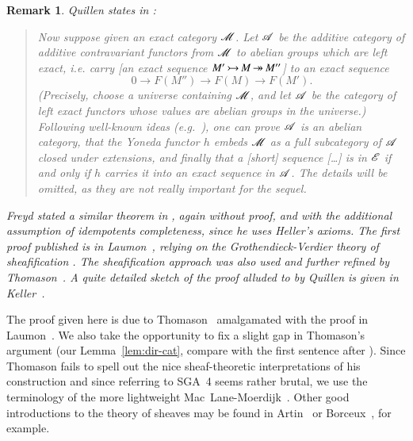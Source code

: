 \documentclass[1p]{elsarticle}
\theoremstyle{mythm}
\theoremstyle{mydef}
\newtheorem{Rem}[Thm]{Remark}
\begin{document}
\begin{Rem}
  Quillen states in \cite[p.~``92/16/100'']{MR0338129}: 
  \begin{quote}
    Now suppose given an exact category $\operatorname{\mathscr{M}}$. Let $\operatorname{\mathscr{A}}$ be the
    additive category of additive contravariant functors from $\operatorname{\mathscr{M}}$
    to abelian groups which are left exact, i.e. carry
    [an exact sequence
    $ M' \operatorname{\rightarrowtail} M \operatorname{\twoheadrightarrow} M''$]
    to an exact sequence
    \[
    0 \to F(M'') \to F(M) \to F(M').
    \]
    (Precisely, choose a universe containing $\operatorname{\mathscr{M}}$, and let $\operatorname{\mathscr{A}}$
    be the category of left exact functors whose values are abelian
    groups in the universe.) Following well-known ideas
    (e.g.~\cite{MR0232821}), one can prove $\operatorname{\mathscr{A}}$ is an abelian
    category, that the Yoneda functor $h$ embeds $\operatorname{\mathscr{M}}$ as a full
    subcategory of $\operatorname{\mathscr{A}}$ closed under extensions, and finally that a
    [short] sequence [\ldots] %
    is in $\operatorname{\mathscr{E}}$ if and only if $h$
    carries it into an exact sequence in $\operatorname{\mathscr{A}}$. The details will be
    omitted, as they are not really important for the sequel.
  \end{quote}

  Freyd stated a similar theorem in \cite{MR0146234}, again without
  proof, and with the additional assumption of idempotents completeness,
  since he uses Heller's axioms. The first proof
  published is in Laumon~\cite[1.0.3]{MR726427}, relying on
  the Grothendieck-Verdier theory of sheaf\mbox{}ification
  \cite{MR0354652}. 
  The sheaf\mbox{}ification approach was also used and further
  refined by Thomason~\cite[Appendix~A]{MR1106918}.
  A quite detailed sketch of the proof alluded to by Quillen is given in
  Keller~\cite[A.3]{MR1052551}.
\end{Rem}


The proof given here is due to Thomason~\cite[A.7]{MR1106918} 
amalgamated with the proof in Laumon~\cite[1.0.3]{MR726427}. 
We also take the opportunity to fix a
slight gap in Thomason's argument (our Lemma~\ref{lem:dir-cat},
compare with the first sentence after \cite[(A.7.10)]{MR1106918}).
Since Thomason fails to spell out the nice
sheaf-theoretic interpretations of his construction and since
referring to SGA~4 seems rather brutal, we use the terminology of the more
lightweight Mac~Lane-Moerdijk~\cite[Chapter~III]{MR1300636}. 
Other good introductions to
the theory of sheaves may be found in Artin~\cite{artin-grothtop} or
Borceux~\cite{MR1315049}, for example.
\end{document}
